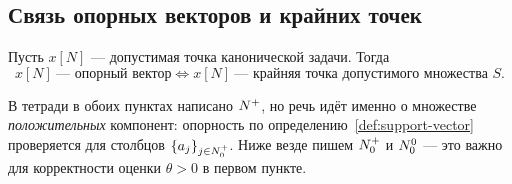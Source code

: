 \subsection{Связь опорных векторов и крайних точек}

\begin{theorem}\label{th:support-extreme}
Пусть $x[N]$ — допустимая точка канонической задачи. Тогда
\[
  x[N] \ \text{— опорный вектор} \iff
  x[N] \ \text{— крайняя точка допустимого множества } S .
\]
\end{theorem}

\begin{idea}
В тетради в обоих пунктах написано $N^{+}$, но речь идёт именно о множестве
\emph{положительных} компонент: опорность по определению~\ref{def:support-vector}
проверяется для столбцов $\{a_j\}_{j \in N_0^{+}}$. Ниже везде пишем $N_0^{+}$ и $N_0^{0}$ —
это важно для корректности оценки $\theta > 0$ в первом пункте.
\end{idea}

